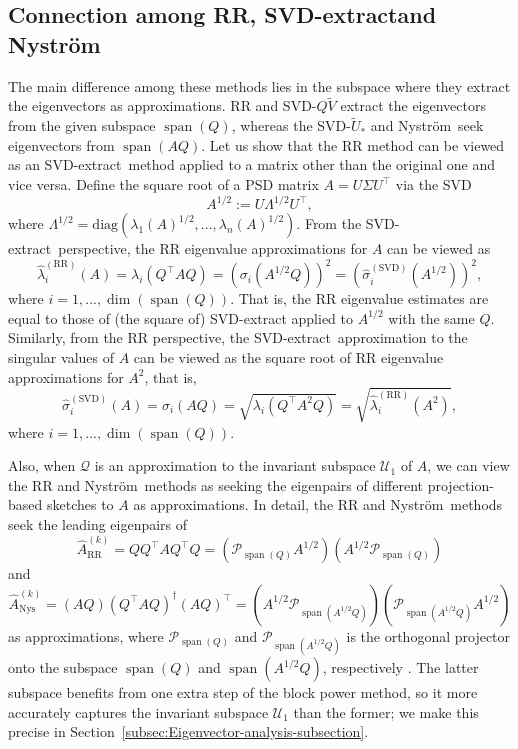 \documentclass[onefignum,onetabnum]{siamart251216}
\def\subspace{\mathcal{Q}}
\def\Nystrom{Nystr{\"o}m}
\def\svdmethod{SVD-extract}
\def\leadingsubspace{\mathcal{U}_1}
\newcommand{\image}{\operatorname{span}}
\begin{document}
\subsection{Connection among RR, \svdmethod and \Nystrom}
\label{sec:Compare-approximate-eigenvalue-RR-vs-SVD-vs-Nystrom}
The main difference among these methods lies in the subspace where they extract the eigenvectors as approximations. RR and SVD-$Q\widetilde{V}$ extract the eigenvectors from the given subspace $\image(Q)$, whereas the SVD-$\widetilde{U}_{*}$ and \Nystrom\ seek eigenvectors from $\image(AQ)$. Let us show that the RR method can be viewed as an \svdmethod\ method applied to a matrix other than the original one and vice versa. Define the square root of a PSD matrix $A = U \Sigma U^\top$ via the SVD
\[
    A^{1/2} := U \Lambda^{1/2} U^\top,
\]
where $\Lambda^{1/2} = \text{diag} (\lambda_1(A)^{1/2}, ..., \lambda_n(A)^{1/2})$. From the \svdmethod\ perspective, the RR eigenvalue approximations for $A$ can be viewed as
\[
    \hat{\lambda}_{i}^{(\text{RR})}(A) = \lambda_{i}(Q^\top A Q) = \left(\sigma_{i}(A^{1/2}Q)\right)^2 = \left(\hat{\sigma}_{i}^{(\text{SVD})}(A^{1/2})\right)^2,
\]
where $i = 1, ..., \dim(\image(Q))$. That is, the RR eigenvalue estimates are equal to those of (the square of) SVD-extract applied to $A^{1/2}$ with the same $Q$. Similarly, from the RR perspective, the \svdmethod\ approximation to the singular values of $A$ can be viewed as the square root of RR eigenvalue approximations for $A^2$, that is,
\[
    \hat{\sigma}_{i}^{(\text{SVD})}(A) = \sigma_{i}(AQ) = \sqrt{\lambda_{i}(Q^\top A^2 Q)} = \sqrt{\hat{\lambda}_{i}^{(\text{RR})}(A^2)},
\]
where $i = 1, ..., \dim(\image(Q))$. 

Also, when $\subspace$ is an approximation to the invariant subspace $\leadingsubspace$ of $A$, we can view the RR and \Nystrom\ methods as seeking the eigenpairs of different projection-based sketches to $A$ as approximations. In detail, the RR and \Nystrom\ methods seek the leading eigenpairs of
\[
    \hat{A}_{\text{RR}}^{(k)} = Q Q^\top A Q^\top Q = \left(\mathcal{P}_{\image(Q)} A^{1/2}\right) \left(A^{1/2} \mathcal{P}_{\image(Q)}\right)
\]
and
\[
    \hat{A}_{\text{Nys}}^{(k)} = (AQ) (Q^\top A Q)^{\dagger} (AQ)^\top = \left(A^{1/2} \mathcal{P}_{\image(A^{1/2}Q)}\right) \left(\mathcal{P}_{\image(A^{1/2}Q)} A^{1/2}\right)
\]
as approximations, where $\mathcal{P}_{\image(Q)}$ and $\mathcal{P}_{\image(A^{1/2}Q)}$ is the orthogonal projector onto the subspace $\image(Q)$ and $\image(A^{1/2}Q)$, respectively \cite{gittens2016revisiting}. The latter subspace benefits from one extra step of the block power method, so it more accurately captures the invariant subspace $\leadingsubspace$ than the former; we make this precise in Section~\ref{subsec:Eigenvector-analysis-subsection}.
\end{document}

